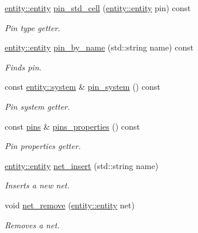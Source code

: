 \begin{DoxyCompactItemize}
\hyperlink{classophidian_1_1entity_1_1entity}{entity\-::entity} \hyperlink{classophidian_1_1netlist_1_1netlist_afeb649d84db0d66c6eda3de31050c15a}{pin\-\_\-std\-\_\-cell} (\hyperlink{classophidian_1_1entity_1_1entity}{entity\-::entity} pin) const 
\begin{DoxyCompactList}\small\item\em Pin type getter. \end{DoxyCompactList}\item 
\hyperlink{classophidian_1_1entity_1_1entity}{entity\-::entity} \hyperlink{classophidian_1_1netlist_1_1netlist_a14efd19c1da2be8f8f05f32ea24d8a61}{pin\-\_\-by\-\_\-name} (std\-::string name) const 
\begin{DoxyCompactList}\small\item\em Finds pin. \end{DoxyCompactList}\item 
const \hyperlink{classophidian_1_1entity_1_1system}{entity\-::system} \& \hyperlink{classophidian_1_1netlist_1_1netlist_a095b98b11c484e944f8be336aca54013}{pin\-\_\-system} () const 
\begin{DoxyCompactList}\small\item\em Pin system getter. \end{DoxyCompactList}\item 
const \hyperlink{classophidian_1_1netlist_1_1pins}{pins} \& \hyperlink{classophidian_1_1netlist_1_1netlist_af7026a773f912f287495378871c98f92}{pins\-\_\-properties} () const 
\begin{DoxyCompactList}\small\item\em Pin properties getter. \end{DoxyCompactList}\item 
\hyperlink{classophidian_1_1entity_1_1entity}{entity\-::entity} \hyperlink{classophidian_1_1netlist_1_1netlist_a95f8833cc5be77bf9baf1232af8fe210}{net\-\_\-insert} (std\-::string name)
\begin{DoxyCompactList}\small\item\em Inserts a new net. \end{DoxyCompactList}\item 
void \hyperlink{classophidian_1_1netlist_1_1netlist_ad56401b6b778bd36cb06ce251b530203}{net\-\_\-remove} (\hyperlink{classophidian_1_1entity_1_1entity}{entity\-::entity} net)
\begin{DoxyCompactList}\small\item\em Removes a net. \end{DoxyCompactList}\item 

\end{DoxyCompactItemize}
